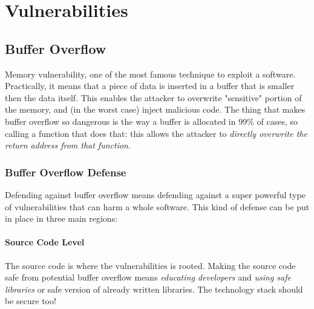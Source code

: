 \documentclass{article}
\begin{document}
		\section{Vulnerabilities}
			\subsection{Buffer Overflow}
				Memory vulnerability, one of the most famous technique to exploit a software. Practically, it means that a piece of data is inserted in a buffer that is smaller then the data itself. This enables the attacker to overwrite "sensitive" portion of the memory, and (in the worst case) inject malicious code. The thing that makes buffer overflow so dangerous is the way a buffer is allocated in 99\% of cases, so calling a function that does that: this allows the attacker to \emph{directly overwrite the return address from that function}.
					
				\subsubsection{Buffer Overflow Defense}
					Defending against buffer overflow means defending against a super powerful type of vulnerabilities that can harm a whole software. This kind of defense can be put in place in three main regions:
					
					\paragraph{Source Code Level}
						The source code is where the vulnerabilities is rooted. Making the source code safe from potential buffer overflow means \emph{educating developers} and \emph{using safe libraries} or safe version of already written libraries. The technology stack should be secure too!
						
\end{document}
